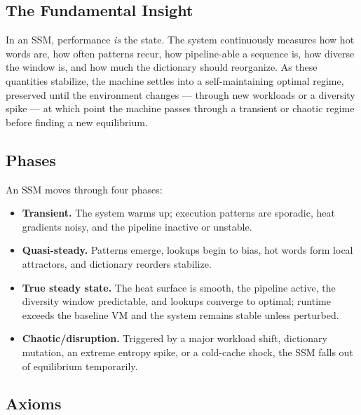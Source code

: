 \subsection{The Fundamental Insight}

In an SSM, performance \emph{is} the state. The system continuously measures how
hot words are, how often patterns recur, how pipeline-able a sequence is, how
diverse the window is, and how much the dictionary should reorganize. As these
quantities stabilize, the machine settles into a self-maintaining optimal regime,
preserved until the environment changes --- through new workloads or a diversity
spike --- at which point the machine passes through a transient or chaotic regime
before finding a new equilibrium.

\subsection{Phases}

An SSM moves through four phases:

\begin{itemize}
  \item \textbf{Transient.} The system warms up; execution patterns are
        sporadic, heat gradients noisy, and the pipeline inactive or unstable.
  \item \textbf{Quasi-steady.} Patterns emerge, lookups begin to bias, hot words
        form local attractors, and dictionary reorders stabilize.
  \item \textbf{True steady state.} The heat surface is smooth, the pipeline
        active, the diversity window predictable, and lookups converge to
        optimal; runtime exceeds the baseline VM and the system remains stable
        unless perturbed.
  \item \textbf{Chaotic/disruption.} Triggered by a major workload shift,
        dictionary mutation, an extreme entropy spike, or a cold-cache shock, the
        SSM falls out of equilibrium temporarily.
\end{itemize}

\subsection{Axioms}

